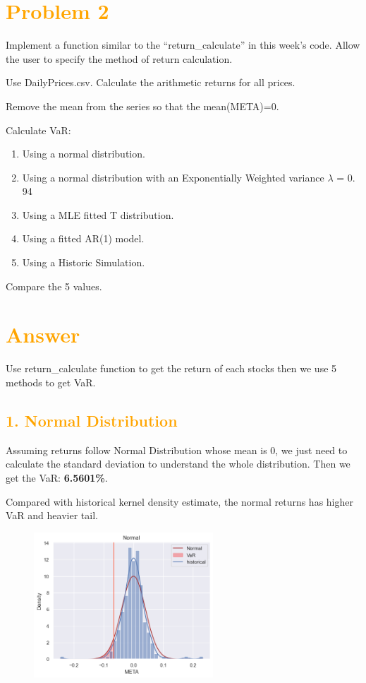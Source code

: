 \documentclass[11pt,en]{elegantpaper}
\begin{document}
\newpage
\section*{\textcolor{orange}{Problem 2}}

Implement a function similar to the “return\_calculate\(\)” in this week's code. Allow the user to specify the method of return calculation.

Use DailyPrices.csv. Calculate the arithmetic returns for all prices.

Remove the mean from the series so that the mean(META)=0.

Calculate VaR:
\begin{enumerate}
    \item Using a normal distribution.
    \item Using a normal distribution with an Exponentially Weighted variance $\lambda$ = 0. 94
    \item Using a MLE fitted T distribution.
    \item Using a fitted AR(1) model.
    \item Using a Historic Simulation.
\end{enumerate}

Compare the 5 values.

\section*{\textcolor{orange}{Answer}}

Use return\_calculate function to get the return of each stocks then we use 5 methods to get VaR.

\subsection*{\textcolor{orange}{1. Normal Distribution}}

Assuming returns follow Normal Distribution whose mean is 0, we just need to calculate the standard deviation to understand the whole distribution. Then we get the VaR: \textbf{6.5601\%}.

Compared with historical kernel density estimate, the normal returns has higher VaR and heavier tail.
\begin{figure}[htbp] 
    \centering 
    \includegraphics[width=0.6\textwidth]{./image/Normal.png} 
\end{figure}
\end{document}
